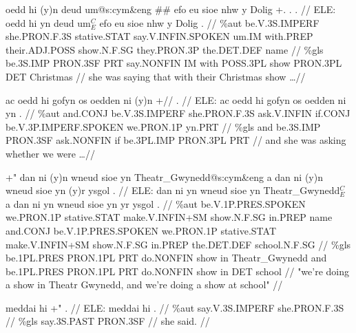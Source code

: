 \documentclass[a4paper,10pt]{article}
\begin{document}
\ex
\begingl[lingstyle=gergl]
\glchat oedd hi (y)n deud um@s:cym\&eng \#\# efo eu sioe nhw y Dolig +. . . //
\glsurface ELE:  oedd hi yn deud um$^{C}_{E}$ efo eu sioe nhw y Dolig .  //
\glauto \%aut  be{\scriptsize .V.3S.IMPERF} she{\scriptsize .PRON.F.3S} stative{\scriptsize .STAT} say{\scriptsize .V.INFIN.SPOKEN} um{\scriptsize .IM} with{\scriptsize .PREP} their{\scriptsize .ADJ.POSS} show{\scriptsize .N.F.SG} they{\scriptsize .PRON.3P} the{\scriptsize .DET.DEF} name   //
\glmanual \%gls  be{\scriptsize .3S.IMP} PRON{\scriptsize .3SF} PRT say{\scriptsize .NONFIN} IM with POSS{\scriptsize .3PL} show PRON{\scriptsize .3PL} DET Christmas   //
\gleng she was saying that with their Christmas show \dots  //
\endgl
\xe

\ex
\begingl[lingstyle=gergl]
\glchat ac oedd hi gofyn os oedden ni (y)n +// . //
\glsurface ELE:  ac oedd hi gofyn os oedden ni yn .  //
\glauto \%aut  and{\scriptsize .CONJ} be{\scriptsize .V.3S.IMPERF} she{\scriptsize .PRON.F.3S} ask{\scriptsize .V.INFIN} if{\scriptsize .CONJ} be{\scriptsize .V.3P.IMPERF.SPOKEN} we{\scriptsize .PRON.1P} yn{\scriptsize .PRT}   //
\glmanual \%gls  and be{\scriptsize .3S.IMP} PRON{\scriptsize .3SF} ask{\scriptsize .NONFIN} if be{\scriptsize .3PL.IMP} PRON{\scriptsize .3PL} PRT   //
\gleng and she was asking whether we were \dots  //
\endgl
\xe

\ex
\begingl[lingstyle=gergl]
\glchat +" dan ni (y)n wneud sioe yn Theatr\_Gwynedd@s:cym\&eng a dan ni (y)n wneud sioe yn (y)r ysgol . //
\glsurface ELE:  dan ni yn wneud sioe yn Theatr\_Gwynedd$^{C}_{E}$ a dan ni yn wneud sioe yn yr ysgol .  //
\glauto \%aut  be{\scriptsize .V.1P.PRES.SPOKEN} we{\scriptsize .PRON.1P} stative{\scriptsize .STAT} make{\scriptsize .V.INFIN+SM} show{\scriptsize .N.F.SG} in{\scriptsize .PREP} name and{\scriptsize .CONJ} be{\scriptsize .V.1P.PRES.SPOKEN} we{\scriptsize .PRON.1P} stative{\scriptsize .STAT} make{\scriptsize .V.INFIN+SM} show{\scriptsize .N.F.SG} in{\scriptsize .PREP} the{\scriptsize .DET.DEF} school{\scriptsize .N.F.SG}   //
\glmanual \%gls  be{\scriptsize .1PL.PRES} PRON{\scriptsize .1PL} PRT do{\scriptsize .NONFIN} show in Theatr\_Gwynedd and be{\scriptsize .1PL.PRES} PRON{\scriptsize .1PL} PRT do{\scriptsize .NONFIN} show in DET school   //
\gleng "we're doing a show in Theatr Gwynedd, and we're doing a show at school" //
\endgl
\xe

\ex
\begingl[lingstyle=gergl]
\glchat meddai hi +" . //
\glsurface ELE:  meddai hi .  //
\glauto \%aut  say{\scriptsize .V.3S.IMPERF} she{\scriptsize .PRON.F.3S}   //
\glmanual \%gls  say{\scriptsize .3S.PAST} PRON{\scriptsize .3SF}   //
\gleng she said. //
\endgl
\xe
\end{document}

